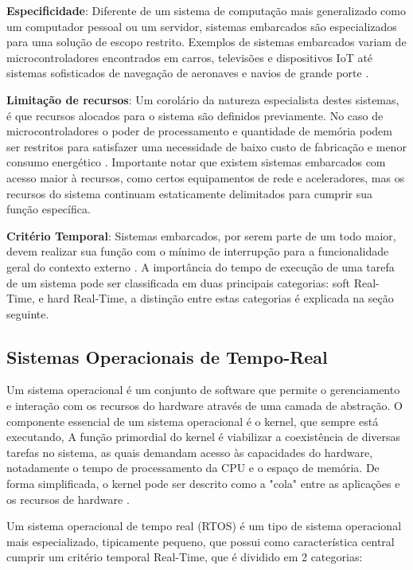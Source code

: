 \textbf{Especificidade}: Diferente de um sistema de computação mais generalizado como um computador pessoal ou um servidor, sistemas embarcados são especializados para uma solução de escopo restrito. Exemplos de sistemas embarcados variam de microcontroladores encontrados em carros, televisões e dispositivos IoT até sistemas sofisticados de navegação de aeronaves e navios de grande porte \cite{ComputerOrganizationAndDesign}.

\textbf{Limitação de recursos}: Um corolário da natureza especialista destes sistemas, é que recursos alocados para o sistema são definidos previamente. No caso de microcontroladores o poder de processamento e quantidade de memória podem ser restritos para satisfazer uma necessidade de baixo custo de fabricação e menor consumo energético \cite{ComputerOrganizationAndDesign}. Importante notar que existem sistemas embarcados com acesso maior à recursos, como certos equipamentos de rede e aceleradores, mas os recursos do sistema continuam estaticamente delimitados para cumprir sua função específica.

\textbf{Critério Temporal}: Sistemas embarcados, por serem parte de um todo maior, devem realizar sua função com o mínimo de interrupção para a funcionalidade geral do contexto externo \cite{OperatingSystemConcepts}. A importância do tempo de execução de uma tarefa de um sistema pode ser classificada em duas principais categorias: soft Real-Time, e hard Real-Time, a distinção entre estas categorias é explicada na seção seguinte.

\subsection{Sistemas Operacionais de Tempo-Real}

Um sistema operacional é um conjunto de software que permite o gerenciamento e interação com os recursos do hardware através de uma camada de abstração. O componente essencial de um sistema operacional é o kernel, que sempre está executando, A função primordial do kernel é viabilizar a coexistência de diversas tarefas no sistema, as quais demandam acesso às capacidades do hardware, notadamente o tempo de processamento da CPU e o espaço de memória. De forma simplificada, o kernel pode ser descrito como a "cola" entre as aplicações e os recursos de hardware \cite{OperatingSystemConcepts}.

Um sistema operacional de tempo real (RTOS) é um tipo de sistema operacional mais especializado, tipicamente pequeno, que possui como característica central cumprir um critério temporal Real-Time, que é dividido em 2 categorias:

